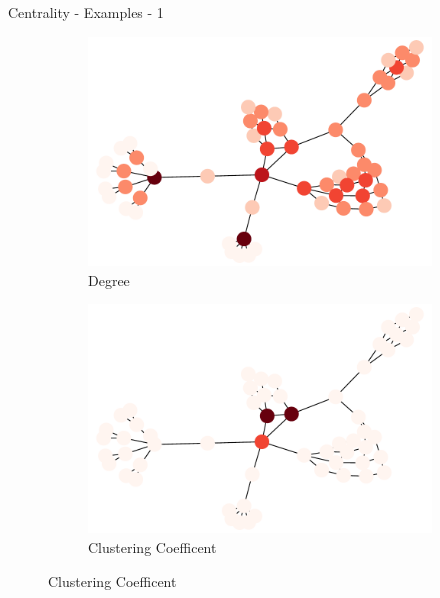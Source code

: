 \documentclass[a4paper,11pt]{book}
\begin{document}
\begin{textbox}{Centrality - Examples - 1}


\begin{figure}[H]

\begin{subfigure}{.5\textwidth}
\includegraphics[width=\textwidth]{pics/exampleDegree.pdf}
    \caption{Degree}
\end{subfigure}
\begin{subfigure}{.5\textwidth}
\includegraphics[width=\textwidth]{pics/exampleCC.pdf}
    \caption{Clustering Coefficent}
\end{subfigure}


\end{figure}
\end{textbox}
\end{document}
